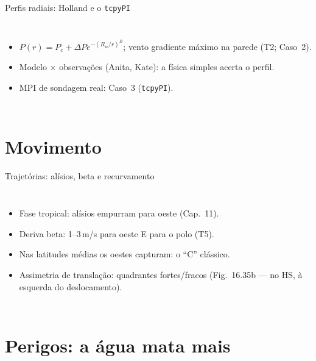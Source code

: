 \documentclass[aspectratio=169,11pt]{beamer}
\begin{document}
\begin{frame}{Perfis radiais: Holland e o \texttt{tcpyPI}}
  \begin{columns}
    \begin{itemize}
      \item $P(r) = P_c + \Delta P e^{-(R_w/r)^B}$; vento gradiente
            máximo na parede (T2; Caso~2).
      \item Modelo × observações (Anita, Kate): a física simples
            acerta o perfil.
      \item MPI de sondagem real: Caso~3 (\texttt{tcpyPI}).
    \end{itemize}
  \end{columns}
\end{frame}

\section{Movimento}

\begin{frame}{Trajetórias: alísios, beta e recurvamento}
  \begin{columns}
    \begin{itemize}
      \item Fase tropical: alísios empurram para oeste (Cap.~11).
      \item Deriva beta: 1--3\,m/s para oeste E para o polo (T5).
      \item Nas latitudes médias os oestes capturam: o ``C'' clássico.
      \item Assimetria de translação: quadrantes fortes/fracos
            (Fig.~16.35b — no HS, à esquerda do deslocamento).
    \end{itemize}
  \end{columns}
\end{frame}

\section{Perigos: a água mata mais}
\end{document}
